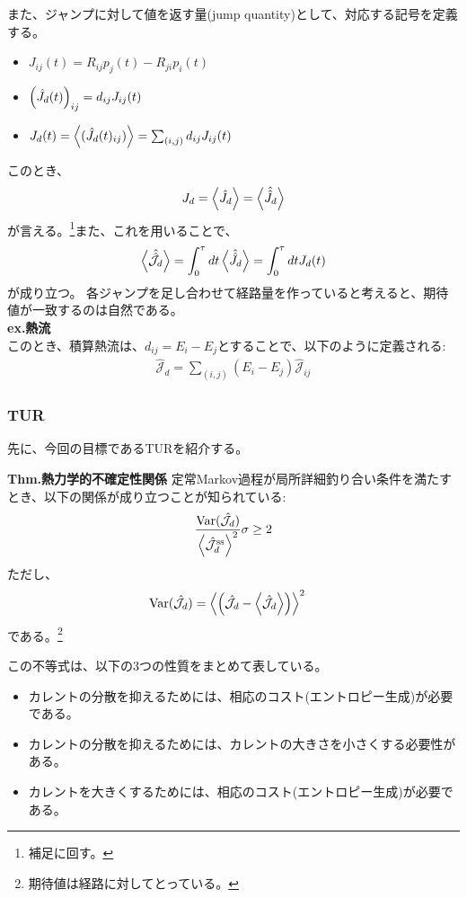 \documentclass[a4paper,11pt]{jsarticle}
\numberwithin{equation}{section}
\begin{document}
また、ジャンプに対して値を返す量(jump quantity)として、対応する記号を定義する。
\begin{itemize}
    \item ${J}_{ij}(t) = R_{ij}p_j(t) - R_{ji}p_i(t)$
    \item $\qty(\hat{J}_{d}(t))_{ij} = d_{ij} {J}_{ij}(t)$
    \item $J_{d}(t) = \ev{(\hat{J}_{d}(t)_{ij})} = \sum_{(i,j)} d_{ij} {J}_{ij}(t)$
\end{itemize}

このとき、
\begin{align}
    J_{d} = \ev{\hat{J}_{d}} = \ev{\hat{\hat{J}}_{d}}
\end{align}
が言える。\footnote{補足に回す。}また、これを用いることで、
\begin{align}
    \ev{\hat{\hat{\mathcal{J}}}_{d} } = \int_{0}^{\tau} dt \ev{\hat{\hat{J}}_{d}} = \int_{0}^{\tau} dt J_{d}(t)
\end{align}
が成り立つ。
各ジャンプを足し合わせて経路量を作っていると考えると、期待値が一致するのは自然である。\\

\textbf{ex.熱流}\\
このとき、積算熱流は、$d_{ij} = E_i - E_{j}$とすることで、以下のように定義される:
\begin{align}
    \hat{\mathcal{J}}_{d} = \sum_{(i,j)} (E_i - E_j) \hat{\mathcal{J}}_{ij}
\end{align}

\subsubsection{TUR}
先に、今回の目標であるTURを紹介する。
\begin{itembox}[l]{\textbf{Thm.熱力学的不確定性関係}}
    定常Markov過程が局所詳細釣り合い条件を満たすとき、以下の関係が成り立つことが知られている:
    \begin{align}
        \frac{\text{Var}(\hat{\mathcal{J}}_d)}{\ev{\hat{\mathcal{J}}_d^{\text{ss}}}^2} \sigma \geq 2
    \end{align}
    ただし、
    \begin{align}
        \text{Var}(\hat{\mathcal{J}}_d) &= \ev{\qty(\hat{\mathcal{J}}_d -\ev{\hat{\mathcal{J}_d}})}^2
    \end{align}
    である。\footnote{期待値は経路に対してとっている。}
\end{itembox}
この不等式は、以下の3つの性質をまとめて表している。
\begin{itemize}
    \item カレントの分散を抑えるためには、相応のコスト(エントロピー生成)が必要である。
    \item カレントの分散を抑えるためには、カレントの大きさを小さくする必要性がある。
    \item カレントを大きくするためには、相応のコスト(エントロピー生成)が必要である。
\end{itemize}
\end{document}
